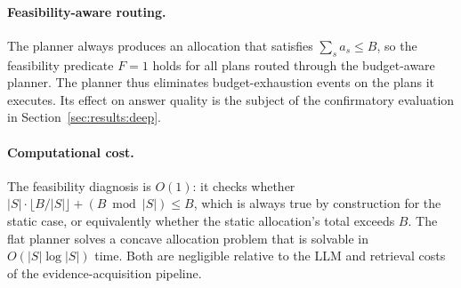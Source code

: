 \paragraph{Feasibility-aware routing.}
The planner always produces an allocation that satisfies $\sum_s a_s \leq B$, so the feasibility predicate $F = 1$ holds for all plans routed through the budget-aware planner. The planner thus eliminates budget-exhaustion events on the plans it executes. Its effect on answer quality is the subject of the confirmatory evaluation in Section~\ref{sec:results:deep}.

\paragraph{Computational cost.}
The feasibility diagnosis is $O(1)$: it checks whether $|S| \cdot \lfloor B / |S| \rfloor + (B \bmod |S|) \leq B$, which is always true by construction for the static case, or equivalently whether the static allocation's total exceeds $B$. The flat planner solves a concave allocation problem that is solvable in $O(|S| \log |S|)$ time. Both are negligible relative to the LLM and retrieval costs of the evidence-acquisition pipeline.
